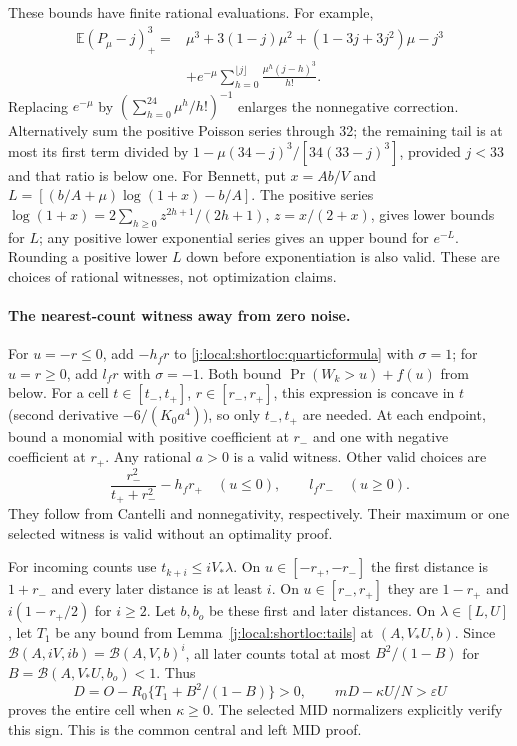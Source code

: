 These bounds have finite rational evaluations. For example,
\begin{align}\label{j:local:shortloc:poissonfinite}
 \mathbb E(P_\mu-j)_+^3={}&\mu^3+3(1-j)\mu^2+(1-3j+3j^2)\mu-j^3\\
 &+e^{-\mu}\sum_{h=0}^{\lfloor j\rfloor}\frac{\mu^h(j-h)^3}{h!}.\nonumber
\end{align}
Replacing $e^{-\mu}$ by $(\sum_{h=0}^{24}\mu^h/h!)^{-1}$ enlarges the
nonnegative correction. Alternatively sum the positive Poisson series
through 32; the remaining tail is at most its first term divided by
$1-\mu(34-j)^3/[34(33-j)^3]$, provided $j<33$ and that ratio is below one.
For Bennett, put $x=Ab/V$ and
$L=[(b/A+\mu)\log(1+x)-b/A]$. The positive series
$\log(1+x)=2\sum_{h\ge0}z^{2h+1}/(2h+1)$, $z=x/(2+x)$, gives lower
bounds for $L$; any positive lower exponential series gives an upper bound
for $e^{-L}$. Rounding a positive lower $L$ down before exponentiation is
also valid. These are choices of rational witnesses, not optimization claims.

\paragraph{The nearest-count witness away from zero noise.}

For $u=-r\le0$, add $-h_fr$ to \eqref{j:local:shortloc:quarticformula} with
$\sigma=1$; for $u=r\ge0$, add $l_fr$ with $\sigma=-1$.
Both bound $\Pr(W_k>u)+f(u)$ from below. For a cell
$t\in[t_-,t_+]$, $r\in[r_-,r_+]$, this expression is concave in $t$
(second derivative $-6/(K_0a^4)$), so only $t_-,t_+$ are needed.
At each endpoint, bound a monomial with positive coefficient at $r_-$
and one with negative coefficient at $r_+$. Any rational $a>0$ is a valid
witness. Other valid choices are
\begin{equation}\label{j:local:shortloc:ownother}
 \frac{r_-^2}{t_++r_-^2}-h_fr_+\quad(u\le0),\qquad l_fr_-\quad(u\ge0).
\end{equation}
They follow from Cantelli and nonnegativity, respectively. Their maximum
or one selected witness is valid without an optimality proof.

For incoming counts use $t_{k+i}\le iV_*\lambda$. On $u\in[-r_+,-r_-]$
the first distance is $1+r_-$ and every later distance is at least $i$.
On $u\in[r_-,r_+]$ they are $1-r_+$ and $i(1-r_+/2)$ for $i\ge2$.
Let $b,b_o$ be these first and later distances. On $\lambda\in[L,U]$,
let $T_1$ be any bound from Lemma~\ref{j:local:shortloc:tails} at $(A,V_*U,b)$.
Since $\mathcal B(A,iV,ib)=\mathcal B(A,V,b)^i$, all later counts total at most
$B^2/(1-B)$ for $B=\mathcal B(A,V_*U,b_o)<1$. Thus
\begin{equation}\label{j:local:shortloc:midtest}
 D=O-R_0\{T_1+B^2/(1-B)\}>0,\qquad
 mD-\kappa U/N>\varepsilon U
\end{equation}
proves the entire cell when $\kappa\ge0$. The selected MID normalizers
explicitly verify this sign. This is the common central and left MID proof.

